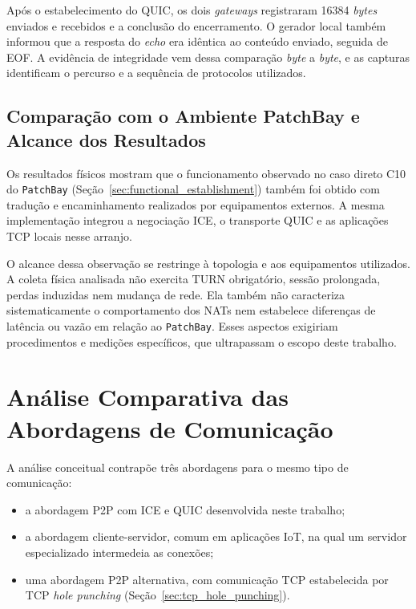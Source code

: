 Após o estabelecimento do QUIC, os dois \textit{gateways} registraram 16384 \textit{bytes} enviados e recebidos e a conclusão do encerramento. O gerador local também informou que a resposta do \textit{echo} era idêntica ao conteúdo enviado, seguida de EOF. A evidência de integridade vem dessa comparação \textit{byte} a \textit{byte}, e as capturas identificam o percurso e a sequência de protocolos utilizados.

\subsection{Comparação com o Ambiente PatchBay e Alcance dos Resultados}

Os resultados físicos mostram que o funcionamento observado no caso direto C10 do \texttt{PatchBay} (Seção~\ref{sec:functional_establishment}) também foi obtido com tradução e encaminhamento realizados por equipamentos externos. A mesma implementação integrou a negociação ICE, o transporte QUIC e as aplicações TCP locais nesse arranjo.

O alcance dessa observação se restringe à topologia e aos equipamentos utilizados. A coleta física analisada não exercita TURN obrigatório, sessão prolongada, perdas induzidas nem mudança de rede. Ela também não caracteriza sistematicamente o comportamento dos NATs nem estabelece diferenças de latência ou vazão em relação ao \texttt{PatchBay}. Esses aspectos exigiriam procedimentos e medições específicos, que ultrapassam o escopo deste trabalho.

\section{Análise Comparativa das Abordagens de Comunicação}
\label{sec:another_connection_approaches}

A análise conceitual contrapõe três abordagens para o mesmo tipo de comunicação:

\begin{itemize}
    \item a abordagem P2P com ICE e QUIC desenvolvida neste trabalho;
    \item a abordagem cliente-servidor, comum em aplicações IoT, na qual um servidor especializado intermedeia as conexões;
    \item uma abordagem P2P alternativa, com comunicação TCP estabelecida por TCP \textit{hole punching} (Seção~\ref{sec:tcp_hole_punching}).
\end{itemize}

